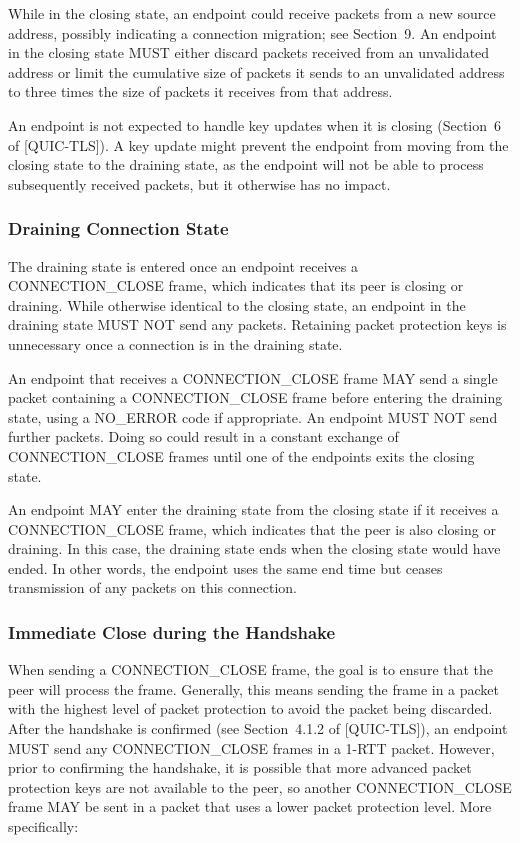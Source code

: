 \documentclass{article}
\begin{document}
While in the closing state, an endpoint could receive packets from a new source address, possibly indicating a connection migration; see Section~9.  An endpoint in the closing state MUST either discard packets received from an unvalidated address or limit the cumulative size of packets it sends to an unvalidated address to three times the size of packets it receives from that address.

An endpoint is not expected to handle key updates when it is closing (Section~6 of [QUIC-TLS]).  A key update might prevent the endpoint from moving from the closing state to the draining state, as the endpoint will not be able to process subsequently received packets, but it otherwise has no impact.

\subsubsection{Draining Connection State}

The draining state is entered once an endpoint receives a CONNECTION\_CLOSE frame, which indicates that its peer is closing or draining.  While otherwise identical to the closing state, an endpoint in the draining state MUST NOT send any packets.  Retaining packet protection keys is unnecessary once a connection is in the draining state.

An endpoint that receives a CONNECTION\_CLOSE frame MAY send a single packet containing a CONNECTION\_CLOSE frame before entering the draining state, using a NO\_ERROR code if appropriate.  An endpoint MUST NOT send further packets.  Doing so could result in a constant exchange of CONNECTION\_CLOSE frames until one of the endpoints exits the closing state.

An endpoint MAY enter the draining state from the closing state if it receives a CONNECTION\_CLOSE frame, which indicates that the peer is also closing or draining.  In this case, the draining state ends when the closing state would have ended.  In other words, the endpoint uses the same end time but ceases transmission of any packets on this connection.

\subsubsection{Immediate Close during the Handshake}

When sending a CONNECTION\_CLOSE frame, the goal is to ensure that the peer will process the frame.  Generally, this means sending the frame in a packet with the highest level of packet protection to avoid the packet being discarded.  After the handshake is confirmed (see Section~4.1.2 of [QUIC-TLS]), an endpoint MUST send any CONNECTION\_CLOSE frames in a 1-RTT packet.  However, prior to confirming the handshake, it is possible that more advanced packet protection keys are not available to the peer, so another CONNECTION\_CLOSE frame MAY be sent in a packet that uses a lower packet protection level.  More specifically:
\end{document}
